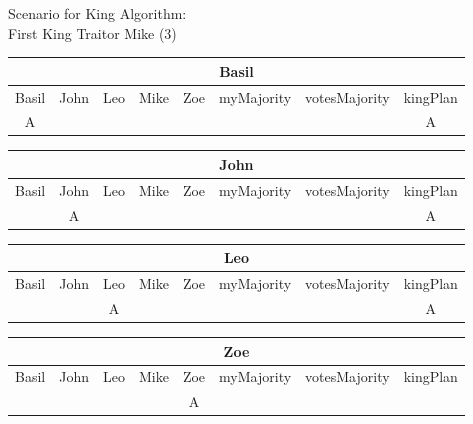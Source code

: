 \begin{wideslide}[bm=,toc=]{\large Scenario for King Algorithm:\\First King Traitor Mike (3)}
\vspace*{2ex}
\begin{center}
\begin{paenv}

\begin{tabular}{|c|c|c|c|c||c|c|c|}
\hline
\multicolumn{8}{|c|}{Basil}\\\hline
Basil & John & Leo & Mike & Zoe & myMajority & votesMajority & kingPlan \\\hline
A&&&&&&&A\\\hline
\end{tabular}
\smallskip

\begin{tabular}{|c|c|c|c|c||c|c|c|}
\hline
\multicolumn{8}{|c|}{John}\\\hline
Basil & John & Leo & Mike & Zoe & myMajority & votesMajority & kingPlan \\\hline
&A&&&&&&A\\\hline
\end{tabular}
\smallskip

\begin{tabular}{|c|c|c|c|c||c|c|c|}
\hline
\multicolumn{8}{|c|}{Leo}\\\hline
Basil & John & Leo & Mike & Zoe & myMajority & votesMajority & kingPlan \\\hline
&&A&&&&&A\\\hline
\end{tabular}
\smallskip

\begin{tabular}{|c|c|c|c|c||c|c|c|}
\hline
\multicolumn{8}{|c|}{Zoe}\\\hline
Basil & John & Leo & Mike & Zoe & myMajority & votesMajority & kingPlan \\\hline
&&&&A&&&\\\hline
\end{tabular}
\end{paenv}
\end{center}
\end{wideslide}

